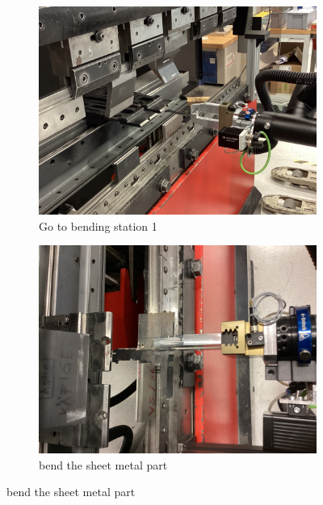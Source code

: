 \begin{figure}[h]
    \centering
    \begin{subfigure}[b]{0.32\textwidth}
        \centering
        \includegraphics[width=\textwidth]{figures/bending/bending1-002.png}
        \caption{Go to bending station 1}
        \label{subfig:bending1-before}
    \end{subfigure}\hspace{0.1cm}
    \begin{subfigure}[b]{0.32\textwidth}
        \centering
        \includegraphics[width=\textwidth]{figures/bending/bending1-003.png}
        \caption{bend the sheet metal part}
        \label{subfig:bending1}
    \end{subfigure}\hspace{0.1cm}

\end{figure}
